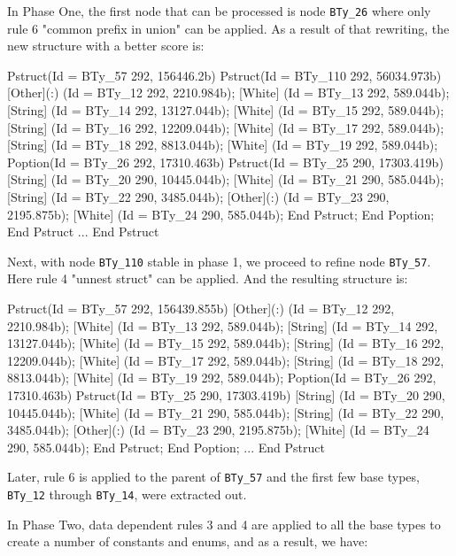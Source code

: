 In Phase One, the first node that can be processed is node {\tt BTy\_26}
where only rule 6 "common prefix in union" can be applied. As a result of that
rewriting, the new structure with a better score is:

\begin{code}
Pstruct(Id = BTy_57 292, 156446.2b)
  Pstruct(Id = BTy_110 292, 56034.973b)
    [Other](:) (Id = BTy_12 292, 2210.984b);
    [White] (Id = BTy_13 292, 589.044b);
    [String] (Id = BTy_14 292, 13127.044b);
    [White] (Id = BTy_15 292, 589.044b);
    [String] (Id = BTy_16 292, 12209.044b);
    [White] (Id = BTy_17 292, 589.044b);
    [String] (Id = BTy_18 292, 8813.044b);
    [White] (Id = BTy_19 292, 589.044b);
    Poption(Id = BTy_26 292, 17310.463b)
      Pstruct(Id = BTy_25 290, 17303.419b)
    	[String] (Id = BTy_20 290, 10445.044b);
    	[White] (Id = BTy_21 290, 585.044b);
    	[String] (Id = BTy_22 290, 3485.044b);
    	[Other](:) (Id = BTy_23 290, 2195.875b);
    	[White] (Id = BTy_24 290, 585.044b);
      End Pstruct;
    End Poption;
  End Pstruct
  ...
End Pstruct
\end{code}

Next, with node {\tt BTy\_110} stable in phase 1, we proceed to
refine node {\tt BTy\_57}. Here rule 4 "unnest struct" can be applied.
And the resulting structure is:

\begin{code}
Pstruct(Id = BTy_57 292, 156439.855b)
  [Other](:) (Id = BTy_12 292, 2210.984b);
  [White] (Id = BTy_13 292, 589.044b);
  [String] (Id = BTy_14 292, 13127.044b);
  [White] (Id = BTy_15 292, 589.044b);
  [String] (Id = BTy_16 292, 12209.044b);
  [White] (Id = BTy_17 292, 589.044b);
  [String] (Id = BTy_18 292, 8813.044b);
  [White] (Id = BTy_19 292, 589.044b);
  Poption(Id = BTy_26 292, 17310.463b)
    Pstruct(Id = BTy_25 290, 17303.419b)
      [String] (Id = BTy_20 290, 10445.044b);
      [White] (Id = BTy_21 290, 585.044b);
      [String] (Id = BTy_22 290, 3485.044b);
      [Other](:) (Id = BTy_23 290, 2195.875b);
      [White] (Id = BTy_24 290, 585.044b);
    End Pstruct;
  End Poption;
  ...
End Pstruct
\end{code}

Later, rule 6 is applied to the parent of {\tt BTy\_57} and the first few
base types, {\tt BTy\_12} through {\tt BTy\_14}, were extracted out. 

In Phase Two, data dependent rules 3 and 4 are applied to all the base types to 
create a number of constants and enums, and as a result, 
we have:

